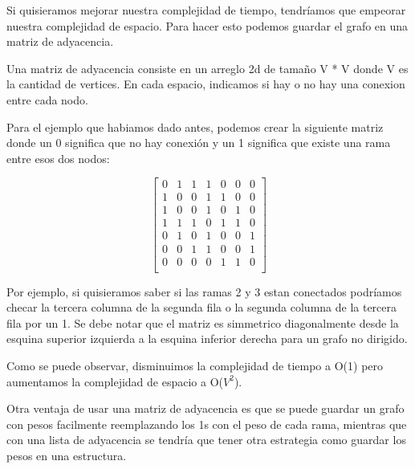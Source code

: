 \documentclass{article}
\begin{document}
Si quisieramos mejorar nuestra complejidad de tiempo, tendríamos que empeorar nuestra complejidad de espacio. Para hacer esto podemos guardar el grafo en una matriz de adyacencia.

Una matriz de adyacencia consiste en un arreglo 2d de tamaño V * V donde V es la cantidad de vertices. En cada espacio, indicamos si hay o no hay una conexion entre cada nodo.

Para el ejemplo que habiamos dado antes, podemos crear la siguiente matriz donde un 0 significa que no hay conexión y un 1 significa que existe una rama entre esos dos nodos:

$$
\begin{bmatrix}
0 & 1 & 1 & 1 & 0 & 0 & 0 \\
1 & 0 & 0 & 1 & 1 & 0 & 0 \\
1 & 0 & 0 & 1 & 0 & 1 & 0 \\
1 & 1 & 1 & 0 & 1 & 1 & 0 \\
0 & 1 & 0 & 1 & 0 & 0 & 1 \\
0 & 0 & 1 & 1 & 0 & 0 & 1 \\
0 & 0 & 0 & 0 & 1 & 1 & 0 \\
\end{bmatrix}
$$

Por ejemplo, si quisieramos saber si las ramas 2 y 3 estan conectados podríamos checar la tercera columna de la segunda fila o la segunda columna de la tercera fila por un 1. Se debe notar que el matriz es simmetrico diagonalmente desde la esquina superior izquierda a la esquina inferior derecha para un grafo no dirigido.

Como se puede observar, disminuimos la complejidad de tiempo a O(1) pero aumentamos la complejidad de espacio a O($V^2$).

Otra ventaja de usar una matriz de adyacencia es que se puede guardar un grafo con pesos facilmente reemplazando los 1s con el peso de cada rama, mientras que con una lista de adyacencia se tendría que tener otra estrategia como guardar los pesos en una estructura.
\end{document}
